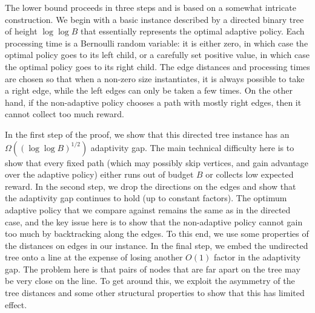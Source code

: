 \documentclass[11pt,letterpaper]{article}
\numberwithin{algorithm}{section}
\begin{document}
The lower bound proceeds in three steps and is based on a somewhat intricate construction.
 We begin with a basic instance described by a directed binary tree of height $\log\log B$ that essentially represents the optimal adaptive policy. Each processing time is a Bernoulli random variable: it is either zero, in which case the optimal policy goes to its left child, or a carefully set positive value, in which case the optimal policy goes to its right child.
The edge distances and processing times are chosen so that when a non-zero size instantiates, it is always possible to take a right edge, while the left edges can only be taken a few times. On the other hand, if the non-adaptive policy chooses a path with mostly right edges, then it cannot collect too much reward.

In the first step of the proof, we show that this directed tree instance has an $\Omega((\log\log B)^{1/2})$ adaptivity gap.
The main technical difficulty here is to show that every fixed path (which may possibly skip vertices, and gain advantage over the adaptive policy) either runs out of budget $B$ or collects low expected reward.
In the second step, we drop the directions on the edges and show that the adaptivity gap continues to hold (up to constant factors). The optimum adaptive policy that we compare against remains the same as in the directed case, and the key issue here is to show that
the non-adaptive policy cannot gain too much by backtracking along the edges.
To this end, we use some properties of the distances on edges in our instance.
In the final step, we embed the undirected tree onto a line at the expense of losing another $O(1)$ factor in  the adaptivity gap.
The problem here is that pairs of nodes that are far apart on the tree may be very close on the line.
To get around this, we exploit the asymmetry of the tree distances and some other structural properties to show that this has limited effect.


\medskip
\end{document}
